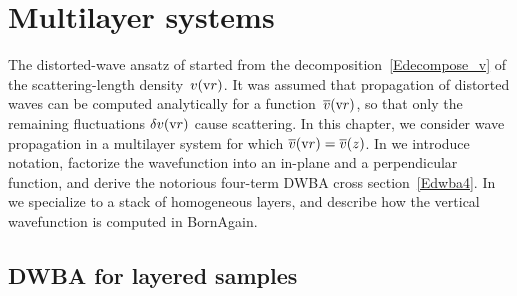 

\chapter{Multilayer systems}  \label{sec:Multilayers}

%

The distorted-wave ansatz of  started from the decomposition~\cref{Edecompose_v}
of the scattering-length density~$v(\text{v}{r})$.
It was assumed that propagation of distorted waves can be computed analytically for
a function~$\overline{v}(\text{v}{r})$,
so that only the remaining fluctuations $\delta v(\text{v}{r})$ cause scattering.
In this chapter, we consider wave propagation in a multilayer system for which
$\overline{v}(\text{v}{r})=\overline{v}(z)$.
In  we introduce notation,
factorize the wavefunction into an in-plane and a perpendicular function,
and derive the notorious four-term DWBA cross section~\cref{Edwba4}.
In  we specialize to a stack of homogeneous layers,
and describe how the vertical wavefunction is computed in BornAgain.



\section{DWBA for layered samples}\label{Swave21}

